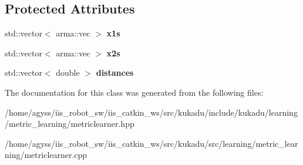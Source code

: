 \subsection*{Protected Attributes}
\begin{DoxyCompactItemize}
\item 
std\+::vector$<$ arma\+::vec $>$ {\bfseries x1s}\hypertarget{classkukadu_1_1MahalanobisLearner_a3ea033162dbf7ac4abec5411551893ca}{}\label{classkukadu_1_1MahalanobisLearner_a3ea033162dbf7ac4abec5411551893ca}

\item 
std\+::vector$<$ arma\+::vec $>$ {\bfseries x2s}\hypertarget{classkukadu_1_1MahalanobisLearner_ae0e587ea27bf3d609707a4eb6f919277}{}\label{classkukadu_1_1MahalanobisLearner_ae0e587ea27bf3d609707a4eb6f919277}

\item 
std\+::vector$<$ double $>$ {\bfseries distances}\hypertarget{classkukadu_1_1MahalanobisLearner_af587d7f1d1679175071497d4c37ceef9}{}\label{classkukadu_1_1MahalanobisLearner_af587d7f1d1679175071497d4c37ceef9}

\end{DoxyCompactItemize}


The documentation for this class was generated from the following files\+:\begin{DoxyCompactItemize}
\item 
/home/agyss/iis\+\_\+robot\+\_\+sw/iis\+\_\+catkin\+\_\+ws/src/kukadu/include/kukadu/learning/metric\+\_\+learning/metriclearner.\+hpp\item 
/home/agyss/iis\+\_\+robot\+\_\+sw/iis\+\_\+catkin\+\_\+ws/src/kukadu/src/learning/metric\+\_\+learning/metriclearner.\+cpp\end{DoxyCompactItemize}

